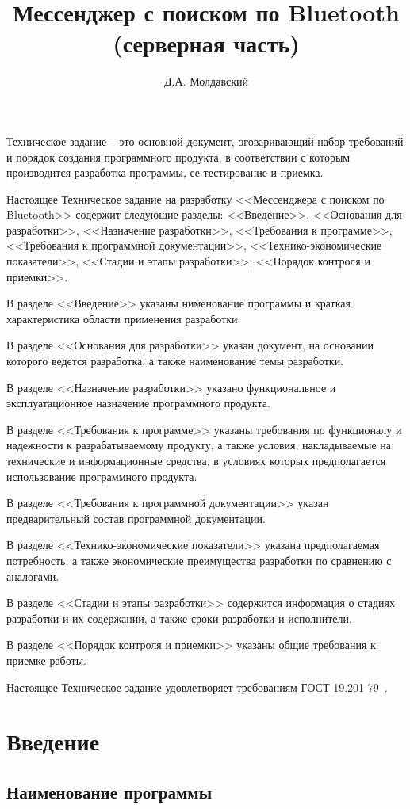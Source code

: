 \documentclass[techtask]{espd}
\author{Д.А. Молдавский}
\title{Мессенджер с поиском по Bluetooth\\(серверная часть)}
\begin{document}
\annotation
Техническое задание -- это основной документ, оговаривающий набор требований и порядок создания программного продукта, в соответствии с которым производится разработка программы, ее тестирование и приемка.

Настоящее Техническое задание на разработку <<Мессенджера с поиском по Bluetooth>> содержит следующие разделы: <<Введение>>, <<Основания для разработки>>, <<Назначение разработки>>, <<Требования к программе>>, <<Требования к программной документации>>, <<Технико-экономические показатели>>, <<Стадии и этапы разработки>>, <<Порядок контроля и приемки>>.

В разделе <<Введение>> указаны нименование программы и краткая характеристика области применения разработки.

В разделе <<Основания для разработки>> указан документ, на основании которого ведется разработка, а также наименование темы разработки.

В разделе <<Назначение разработки>> указано функциональное и эксплуатационное назначение программного продукта.

В разделе <<Требования к программе>> указаны требования по функционалу и надежности к разрабатываемому продукту, а также условия, накладываемые на технические и информационные средства, в условиях которых предполагается использование программного продукта.

В разделе <<Требования к программной документации>> указан предварительный состав программной документации.

В разделе <<Технико-экономические показатели>> указана предполагаемая потребность, а также экономические преимущества разработки по сравнению с аналогами.

В разделе <<Стадии и этапы разработки>> содержится информация о стадиях разработки и их содержании, а также сроки разработки и исполнители.

В разделе <<Порядок контроля и приемки>> указаны общие требования к приемке работы.

Настоящее Техническое задание удовлетворяет требованиям ГОСТ 19.201-79~\cite{espd201}.

\tableofcontents

\section{Введение}
\subsection{Наименование программы}
\end{document}
